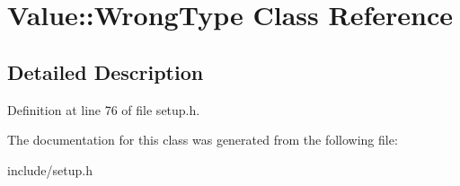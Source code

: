 \hypertarget{classValue_1_1WrongType}{\section{Value\-:\-:Wrong\-Type Class Reference}
\label{classValue_1_1WrongType}
}


\subsection{Detailed Description}


Definition at line 76 of file setup.\-h.



The documentation for this class was generated from the following file\-:\begin{DoxyCompactItemize}
\item 
include/setup.\-h\end{DoxyCompactItemize}
